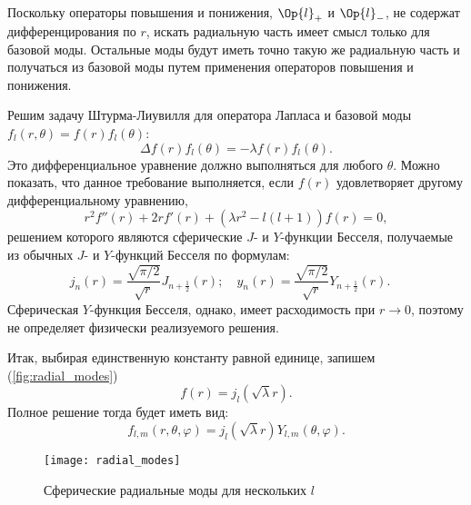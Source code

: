     Поскольку операторы повышения и понижения, $\Op{l}_{+}$ и $\Op{l}_{-}$, не содержат дифференцирования по $r$, искать радиальную часть имеет смысл только для базовой моды. Остальные моды будут иметь точно такую же радиальную часть и получаться из базовой моды путем применения операторов повышения и понижения.

    Решим задачу Штурма-Лиувилля для оператора Лапласа и базовой моды $f_{l}(r,\theta) = f(r) f_{l}(\theta)$:
    \begin{equation}
        \Delta f(r) f_{l}(\theta) = - \lambda f(r) f_{l}(\theta) .
    \end{equation}
    Это дифференциальное уравнение должно выполняться для любого $\theta$. Можно показать, что данное требование выполняется, если $f(r)$ удовлетворяет другому дифференциальному уравнению,
    \begin{equation}
        r^2 f''(r) + 2 r f'(r) + (\lambda r^2 - l(l+1)) f(r) = 0 ,
    \end{equation}
    решением которого являются сферические $J$- и $Y$-функции Бесселя, получаемые из обычных $J$- и $Y$-функций Бесселя по формулам:
    \begin{equation}
        j_n(r) = \frac{\sqrt{\pi/2}}{\sqrt{r}} J_{n+\frac{1}{2}}(r) ; \quad
        y_n(r) = \frac{\sqrt{\pi/2}}{\sqrt{r}} Y_{n+\frac{1}{2}}(r) . \quad
    \end{equation}
    Сферическая $Y$-функция Бесселя, однако, имеет расходимость при $r \to 0$, поэтому не определяет физически реализуемого решения.

    Итак, выбирая единственную константу равной единице, запишем (\autoref{fig:radial_modes})
    \begin{equation}
        f(r) = j_l(\sqrt{\lambda} r) .
    \end{equation}
    Полное решение тогда будет иметь вид:
    \begin{equation}
        f_{l,m}(r,\theta,\varphi)
            = j_l(\sqrt{\lambda} r) Y_{l,m}(\theta,\varphi) .
    \end{equation}
    \begin{figure}[h]
        \centering
        \texttt{[image: radial\_modes]}
        \caption[]{Сферические радиальные моды для нескольких $l$}
        \label{fig:radial_modes}
    \end{figure}

%
%
%
%
%
%

